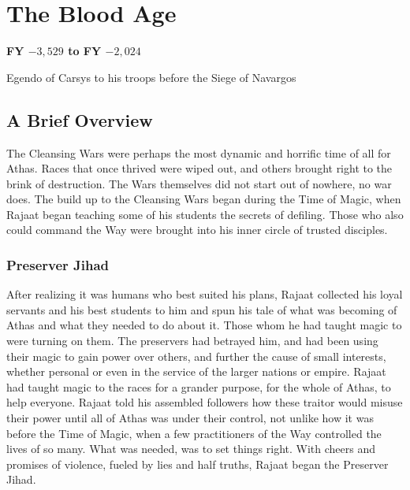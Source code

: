 \section{The Blood Age}
\textbf{FY $-3,529$ to FY $-2,024$}

{Egendo of Carsys to his troops before the Siege of Navargos}

\subsection{A Brief Overview}
The Cleansing Wars were perhaps the most dynamic and horrific time of all for Athas. Races that once thrived were wiped out, and others brought right to the brink of destruction. The Wars themselves did not start out of nowhere, no war does. The build up to the Cleansing Wars began during the Time of Magic, when Rajaat began teaching some of his students the secrets of defiling. Those who also could command the Way were brought into his inner circle of trusted disciples.

\subsubsection{Preserver Jihad}
After realizing it was humans who best suited his plans, Rajaat collected his loyal servants and his best students to him and spun his tale of what was becoming of Athas and what they needed to do about it. Those whom he had taught magic to were turning on them. The preservers had betrayed him, and had been using their magic to gain power over others, and further the cause of small interests, whether personal or even in the service of the larger nations or empire. Rajaat had taught magic to the races for a grander purpose, for the whole of Athas, to help everyone. Rajaat told his assembled followers how these traitor would misuse their power until all of Athas was under their control, not unlike how it was before the Time of Magic, when a few practitioners of the Way controlled the lives of so many. What was needed, was to set things right. With cheers and promises of violence, fueled by lies and half truths, Rajaat began the Preserver Jihad.

